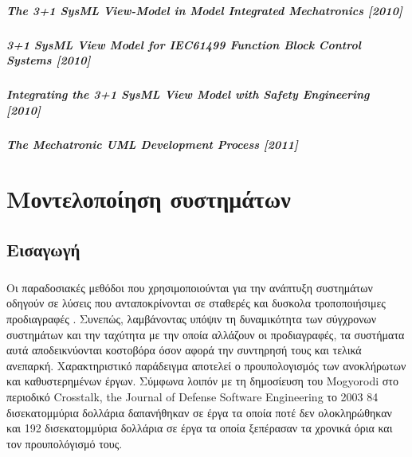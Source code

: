 \documentclass[a4paper,12pt,twoside]{report}
\begin{document}
{				\paragraph{The 3+1 SysML View-Model in Model Integrated Mechatronics [2010]}{\cite{The3+1SysmlView-ModelInMIM:Thramboulidis2010}
				}
				
				\paragraph{3+1 SysML View Model for IEC61499 Function
Block Control Systems [2010]}{\cite{3+1SysnlViewModelForIEC61499FBContolSystems:Thramboulidis2010}
				}
				
				\paragraph{Integrating the 3+1 SysML View Model
with Safety Engineering [2010]}{\cite{IntegratingThe3+1SysnlViewModelWithSafetyEngineering:Thramboulidis2010}
				}
				
				\paragraph{The Mechatronic UML Development Process [2011] }{
				}
				
				
				
				
	\chapter{Μοντελοποίηση συστημάτων}
		\label{κεφ.:Μοντελοποίηση συστημάτων}

		\section{Εισαγωγή}
			\paragraph{} {Οι παραδοσιακές μεθόδοι που χρησιμοποιούνται για την ανάπτυξη συστημάτων οδηγούν σε λύσεις που ανταποκρίνονται σε σταθερές και δυσκολα τροποποιήσιμες προδιαγραφές . Συνεπώς, λαμβάνοντας υπόψιν τη δυναμικότητα των σύγχρονων συστημάτων και την ταχύτητα με την οποία αλλάζουν οι προδιαγραφές, τα συστήματα αυτά αποδεικνύονται κοστοβόρα όσον αφορά την συντηρησή τους και τελικά ανεπαρκή. Χαρακτηριστικό παράδειγμα αποτελεί ο προυπολογισμός των ανοκλήρωτων και καθυστερημένων έργων. Σύμφωνα λοιπόν με τη δημοσίευση του Mogyorodi στο περιοδικό Crosstalk, the Journal of Defense Software Engineering το 2003 \cite{JournalDefenseMogyorodi} 84 δισεκατομμύρια δολλάρια δαπανήθηκαν σε έργα τα οποία ποτέ δεν ολοκληρώθηκαν και 192 δισεκατομμύρια δολλάρια σε έργα τα οποία ξεπέρασαν τα χρονικά όρια και τον προυπολόγισμό τους.
			}
}
\end{document}
